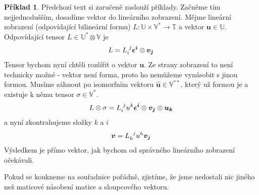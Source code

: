 \documentclass[a5paper,12pt]{amsbook}
\theoremstyle{definition}
\newtheorem{example}{Příklad}[chapter]
\newcommand{\myvec}[1]{\bm{#1}}
\newcommand{\myspace}[1]{\mathbb{#1}}
\newcommand{\mycocovec}[1]{\mathbf{\widehat{#1}}}
\begin{document}
\begin{example}
Předchozí text si zaručeně zaslouží příklady. Začněme tím nejjednodušším,
dosadíme vektor do lineárního zobrazení. Mějme lineární zobrazení
(odpovídající bilineární formu)
$L: \myspace{U}\times\myspace{V^*}\rightarrow\myspace{T}$ a vektor
$\myvec{u}\in\myspace{U}$. Odpovídající tensor $L \in \myspace{U^*}\otimes\myspace{V}$
je
\begin{equation*}
\begin{split}
L = L\indices{_i^j} \myvec{\epsilon^i}\otimes\myvec{v_j}
\end{split}
\end{equation*}
Tensor bychom nyní chtěli rozšířit o vektor $\myvec{u}$. Ze strany zobrazení
to není technicky možné - vektor není forma, proto ho nemůžeme vynásobit s jinou
formou. Musíme sáhnout po isomorfním vektoru $\mycocovec{u}\in\myspace{V^{**}}$,
který už formou je a existuje k němu tensor $\sigma\in\myspace{V^*}$.
\begin{equation*}
\begin{split}
L\otimes\sigma = L\indices{_i^j} u^k \myvec{\epsilon^i}\otimes\myvec{v_j}\otimes\myvec{u_k}
\end{split}
\end{equation*}
a nyní zkontrahujeme složky $k$ a $i$
\begin{equation*}
\begin{split}
\myvec{v} = L\indices{_h^j} u^h \myvec{v_j}
\end{split}
\end{equation*}
Výsledkem je přímo vektor, jak bychom od správného lineárního zobrazení očekávali.

Pokud se koukneme na souřadnice pořádně, zjistíme, že jsme nedostali nic jiného
než maticové násobení matice a sloupcového vektoru.

\end{example}
\end{document}
